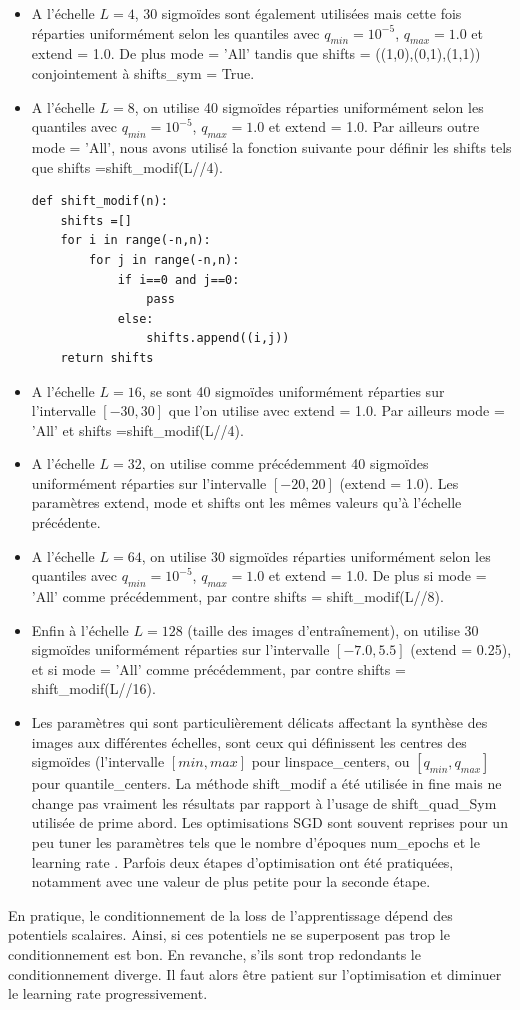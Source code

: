 \documentclass[12pt,twoside]{article}
\newcommand{\itemb}{\item[$\bullet$]}
\begin{document}
\begin{itemize}
%
\itemb A l'échelle $L=4$,  30 sigmoïdes sont également utilisées mais cette fois réparties uniformément selon les quantiles avec $q_{min}=10^{-5}$, $q_{max}=1.0$ et \textsf{extend = 1.0}. De plus \textsf{mode = 'All'} tandis que \textsf{shifts = ((1,0),(0,1),(1,1))} conjointement à \textsf{shifts\_sym = True}.
%
\itemb A l'échelle $L=8$, on utilise 40 sigmoïdes réparties uniformément selon les quantiles avec $q_{min}=10^{-5}$, $q_{max}=1.0$ et \textsf{extend = 1.0}. Par ailleurs outre \textsf{mode = 'All'}, nous avons utilisé la fonction suivante pour définir les shifts tels que 
\textsf{shifts =shift\_modif(L//4)}.
\begin{lstlisting}[language=iPython]
def shift_modif(n):
    shifts =[]
    for i in range(-n,n):
        for j in range(-n,n):
            if i==0 and j==0:
                pass
            else:
                shifts.append((i,j))
    return shifts
\end{lstlisting}
%
\itemb A l'échelle $L=16$, se sont 40 sigmoïdes uniformément réparties sur l'intervalle $[-30, 30]$ que l'on utilise avec \textsf{extend = 1.0}. Par ailleurs \textsf{mode = 'All'} et 
\textsf{shifts =shift\_modif(L//4)}.
%
\itemb A l'échelle $L=32$, on utilise comme précédemment 40 sigmoïdes uniformément réparties sur l'intervalle $[-20, 20]$ (\textsf{extend = 1.0}). Les paramètres \textsf{extend}, \textsf{mode} et \textsf{shifts} ont les mêmes valeurs qu'à l'échelle précédente.
%
\itemb A l'échelle $L=64$, on utilise 30 sigmoïdes réparties uniformément selon les quantiles avec $q_{min}=10^{-5}$, $q_{max}=1.0$ et \textsf{extend = 1.0}. De plus si \textsf{mode = 'All'} comme précédemment, par contre \textsf{shifts = shift\_modif(L//8)}.
%
\itemb Enfin à l'échelle $L=128$ (taille des images d'entraînement), on utilise  30 sigmoïdes uniformément réparties sur l'intervalle $[-7.0, 5.5]$ (\textsf{extend = 0.25}), et si \textsf{mode = 'All'} comme précédemment, par contre \textsf{shifts = shift\_modif(L//16)}.
%
\itemb Les paramètres qui sont particulièrement délicats affectant la synthèse des images aux différentes échelles, sont ceux qui définissent les centres des sigmoïdes (l'intervalle $[min,max]$ pour \textsf{linspace\_centers}, ou $[q_{min},q_{max}]$ pour \textsf{quantile\_centers}. La méthode \textsf{shift\_modif} a été utilisée in fine mais ne change pas vraiment les résultats par rapport à l'usage de \textsf{shift\_quad\_Sym} utilisée de prime abord. Les optimisations SGD sont souvent reprises pour un peu tuner les paramètres tels que le nombre d'époques \textsf{num\_epochs} et le learning rate . Parfois deux étapes d'optimisation ont été pratiquées, notamment avec une valeur de   plus petite pour la seconde étape.
\end{itemize}
%
En pratique, le conditionnement de la loss de l'apprentissage dépend des potentiels scalaires. Ainsi, si ces potentiels ne se superposent pas trop le conditionnement est bon. En revanche, s'ils sont trop redondants le conditionnement diverge. Il faut alors être patient sur l'optimisation et diminuer le learning rate progressivement. 
\end{document}

